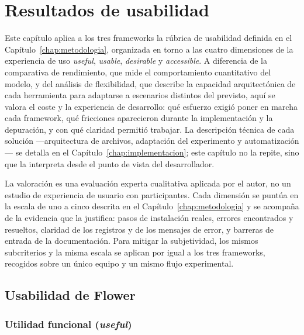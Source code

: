 \chapter{Resultados de usabilidad}\label{chap:usabilidad}

Este capítulo aplica a los tres frameworks la rúbrica de usabilidad definida en el
Capítulo~\ref{chap:metodologia}, organizada en torno a las cuatro dimensiones de la
experiencia de uso \textit{useful}, \textit{usable}, \textit{desirable} y
\textit{accessible}. A diferencia de la comparativa de rendimiento, que mide el
comportamiento cuantitativo del modelo, y del análisis de flexibilidad, que describe la
capacidad arquitectónica de cada herramienta para adaptarse a escenarios distintos del
previsto, aquí se valora el coste y la experiencia de desarrollo: qué esfuerzo exigió
poner en marcha cada framework, qué fricciones aparecieron durante la implementación y la
depuración, y con qué claridad permitió trabajar. La descripción técnica de cada solución
—arquitectura de archivos, adaptación del experimento y automatización— se detalla en el
Capítulo~\ref{chap:implementacion}; este capítulo no la repite, sino que la interpreta
desde el punto de vista del desarrollador.

La valoración es una evaluación experta cualitativa aplicada por el autor, no un estudio
de experiencia de usuario con participantes. Cada dimensión se puntúa en la escala de uno
a cinco descrita en el Capítulo~\ref{chap:metodologia} y se acompaña de la evidencia que
la justifica: pasos de instalación reales, errores encontrados y resueltos, claridad de
los registros y de los mensajes de error, y barreras de entrada de la documentación. Para
mitigar la subjetividad, los mismos subcriterios y la misma escala se aplican por igual a
los tres frameworks, recogidos sobre un único equipo y un mismo flujo experimental.

\section{Usabilidad de Flower}\label{sec:usab-flower}

\subsection{Utilidad funcional (\textit{useful})}\label{sec:usab-flower-useful}

